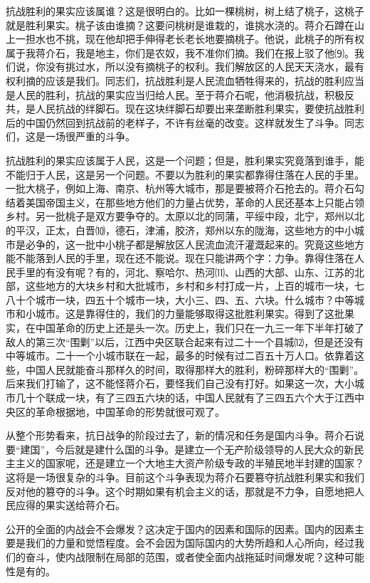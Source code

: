 \documentclass[UTF-8, a5paper, 12pt]{ctexart}
\begin{document}
    抗战胜利的果实应该属谁？这是很明白的。比如一棵桃树，树上结了桃子，这桃子就是胜利果实。桃子该由谁摘？这要问桃树是谁栽的，谁挑水浇的。蒋介石蹲在山上一担水也不挑，现在他却把手伸得老长老长地要摘桃子。他说，此桃子的所有权属于我蒋介石，我是地主，你们是农奴，我不准你们摘。我们在报上驳了他⑼。我们说，你没有挑过水，所以没有摘桃子的权利。我们解放区的人民天天浇水，最有权利摘的应该是我们。同志们，抗战胜利是人民流血牺牲得来的，抗战的胜利应当是人民的胜利，抗战的果实应当归给人民。至于蒋介石呢，他消极抗战，积极反共，是人民抗战的绊脚石。现在这块绊脚石却要出来垄断胜利果实，要使抗战胜利后的中国仍然回到抗战前的老样子，不许有丝毫的改变。这样就发生了斗争。同志们，这是一场很严重的斗争。
    
    抗战胜利的果实应该属于人民，这是一个问题；但是，胜利果实究竟落到谁手，能不能归于人民，这是另一个问题。不要以为胜利的果实都靠得住落在人民的手里。一批大桃子，例如上海、南京、杭州等大城市，那是要被蒋介石抢去的。蒋介石勾结着美国帝国主义，在那些地方他们的力量占优势，革命的人民还基本上只能占领乡村。另一批桃子是双方要争夺的。太原以北的同蒲，平绥中段，北宁，郑州以北的平汉，正太，白晋⑽，德石，津浦，胶济，郑州以东的陇海，这些地方的中小城市是必争的，这一批中小桃子都是解放区人民流血流汗灌溉起来的。究竟这些地方能不能落到人民的手里，现在还不能说。现在只能讲两个字：力争。靠得住落在人民手里的有没有呢？有的，河北、察哈尔、热河⑾、山西的大部、山东、江苏的北部，这些地方的大块乡村和大批城市，乡村和乡村打成一片，上百的城市一块，七八十个城市一块，四五十个城市一块，大小三、四、五、六块。什么城市？中等城市和小城市。这是靠得住的，我们的力量能够取得这批胜利果实。得到了这批果实，在中国革命的历史上还是头一次。历史上，我们只在一九三一年下半年打破了敌人的第三次“围剿”以后，江西中央区联合起来有过二十一个县城⑿，但是还没有中等城市。二十一个小城市联在一起，最多的时候有过二百五十万人口。依靠着这些，中国人民就能奋斗那样久的时间，取得那样大的胜利，粉碎那样大的“围剿”。后来我们打输了，这不能怪蒋介石，要怪我们自己没有打好。如果这一次，大小城市几十个联成一块，有了三四五六块的话，中国人民就有了三四五六个大于江西中央区的革命根据地，中国革命的形势就很可观了。
    
    从整个形势看来，抗日战争的阶段过去了，新的情况和任务是国内斗争。蒋介石说要“建国”，今后就是建什么国的斗争。是建立一个无产阶级领导的人民大众的新民主主义的国家呢，还是建立一个大地主大资产阶级专政的半殖民地半封建的国家？这将是一场很复杂的斗争。目前这个斗争表现为蒋介石要篡夺抗战胜利果实和我们反对他的篡夺的斗争。这个时期如果有机会主义的话，那就是不力争，自愿地把人民应得的果实送给蒋介石。
    
    公开的全面的内战会不会爆发？这决定于国内的因素和国际的因素。国内的因素主要是我们的力量和觉悟程度。会不会因为国际国内的大势所趋和人心所向，经过我们的奋斗，使内战限制在局部的范围，或者使全面内战拖延时间爆发呢？这种可能性是有的。
    
\end{document}

